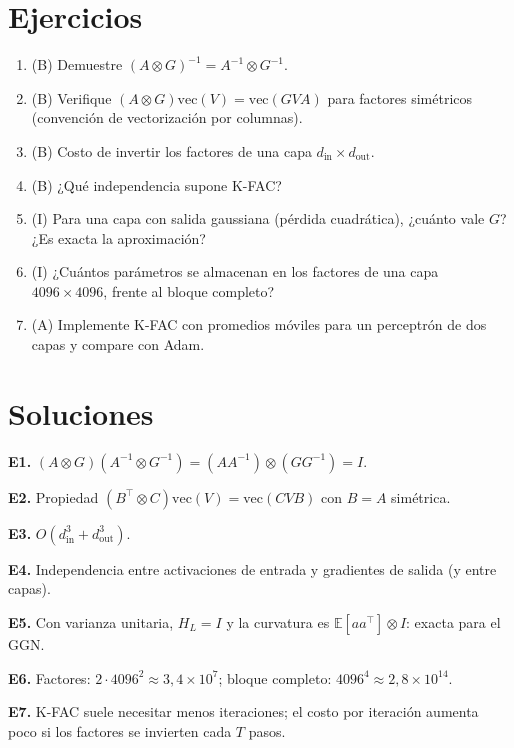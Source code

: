 \documentclass[11pt,a4paper]{article}
\begin{document}
\section{Ejercicios}
\begin{enumerate}[label=\textbf{E\arabic*.}]
\item (B) Demuestre $(A\otimes G)^{-1}=A^{-1}\otimes G^{-1}$.
\item (B) Verifique $(A\otimes G)\mathrm{vec}(V)=\mathrm{vec}(GVA)$ para factores simétricos (convención de vectorización por columnas).
\item (B) Costo de invertir los factores de una capa $d_\text{in}\times d_\text{out}$.
\item (B) ¿Qué independencia supone K-FAC?
\item (I) Para una capa con salida gaussiana (pérdida cuadrática), ¿cuánto vale $G$? ¿Es exacta la aproximación?
\item (I) ¿Cuántos parámetros se almacenan en los factores de una capa $4096\times4096$, frente al bloque completo?
\item (A) Implemente K-FAC con promedios móviles para un perceptrón de dos capas y compare con Adam.
\end{enumerate}
\section{Soluciones}
\begin{solucion}
\textbf{E1.} $(A\otimes G)(A^{-1}\otimes G^{-1})=(AA^{-1})\otimes(GG^{-1})=I$.

\textbf{E2.} Propiedad $(B^\top\otimes C)\mathrm{vec}(V)=\mathrm{vec}(CVB)$ con $B=A$ simétrica.

\textbf{E3.} $O(d_\text{in}^3+d_\text{out}^3)$.

\textbf{E4.} Independencia entre activaciones de entrada y gradientes de salida (y entre capas).

\textbf{E5.} Con varianza unitaria, $H_L=I$ y la curvatura es $\mathbb E[aa^\top]\otimes I$: exacta para el GGN.

\textbf{E6.} Factores: $2\cdot4096^2\approx3{,}4\times10^7$; bloque completo: $4096^4\approx2{,}8\times10^{14}$.

\textbf{E7.} K-FAC suele necesitar menos iteraciones; el costo por iteración aumenta poco si los factores se invierten cada $T$ pasos.
\end{solucion}
\end{document}
